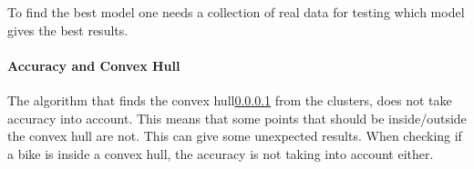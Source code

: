 To find the best model one needs a collection of real data for testing which model gives the best results.

\paragraph{Accuracy and Convex Hull}
The algorithm that finds the convex hull\cref{} from the clusters, does not take accuracy into account.
This means that some points that should be inside/outside the convex hull are not.
This can give some unexpected results.
When checking if a bike is inside a convex hull, the accuracy is not taking into account either.
